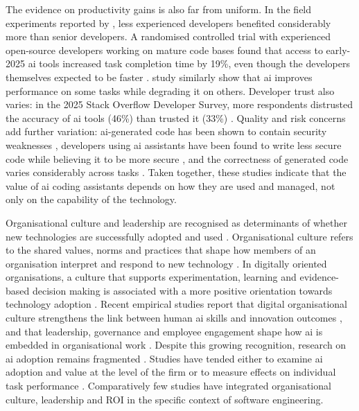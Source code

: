 The evidence on productivity gains is also far from uniform. In the field experiments reported by \textcite{Cui2026}, less experienced developers benefited considerably more than senior developers. A randomised controlled trial with experienced open-source developers working on mature code bases found that access to early-2025 \gls{ai} tools increased task completion time by 19\%, even though the developers themselves expected to be faster \parencite{Becker2025}. \textcite{DellAcqua2023} study similarly show that \gls{ai} improves performance on some tasks while degrading it on others. Developer trust also varies: in the 2025 Stack Overflow Developer Survey, more respondents distrusted the accuracy of \gls{ai} tools (46\%) than trusted it (33\%) \parencite{StackOverflow2025}. Quality and risk concerns add further variation: \gls{ai}-generated code has been shown to contain security weaknesses \parencite{Pearce2022}, developers using \gls{ai} assistants have been found to write less secure code while believing it to be more secure \parencite{Perry2023}, and the correctness of generated code varies considerably across tasks \parencite{MoradiDakhel2023}. Taken together, these studies indicate that the value of \gls{ai} coding assistants depends on how they are used and managed, not only on the capability of the technology.

Organisational culture and leadership are recognised as determinants of whether new technologies are successfully adopted and used \parencite{Johnk2021, Uren2023}. Organisational culture refers to the shared values, norms and practices that shape how members of an organisation interpret and respond to new technology \parencite{Murire2024, An2024}. In digitally oriented organisations, a culture that supports experimentation, learning and evidence-based decision making is associated with a more positive orientation towards technology adoption \parencite{An2024, FossoWamba2024}. Recent empirical studies report that digital organisational culture strengthens the link between human \gls{ai} skills and innovation outcomes \parencite{An2024}, and that leadership, governance and employee engagement shape how \gls{ai} is embedded in organisational work \parencite{Hossain2025, Murire2024, Schneider2023}. Despite this growing recognition, research on \gls{ai} adoption remains fragmented \parencite{Romeo2025, Enholm2022}. Studies have tended either to examine \gls{ai} adoption and value at the level of the firm \parencite{Babina2024, Mikalef2021, Berente2021} or to measure effects on individual task performance \parencite{Peng2023, Noy2023, Brynjolfsson2025, Cui2026}. Comparatively few studies have integrated organisational culture, leadership and ROI in the specific context of software engineering.


